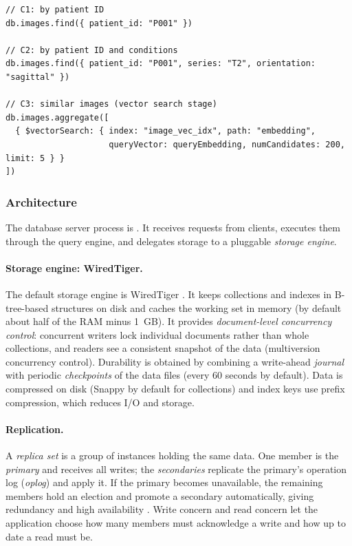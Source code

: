 \begin{lstlisting}[language=mongosh,caption={Query forms of the three case studies (sketch)}]
// C1: by patient ID
db.images.find({ patient_id: "P001" })

// C2: by patient ID and conditions
db.images.find({ patient_id: "P001", series: "T2", orientation: "sagittal" })

// C3: similar images (vector search stage)
db.images.aggregate([
  { $vectorSearch: { index: "image_vec_idx", path: "embedding",
                     queryVector: queryEmbedding, numCandidates: 200, limit: 5 } }
])
\end{lstlisting}

\subsubsection{Architecture}
\label{sec:mongodb-arch}
The database server process is . It receives requests from clients, executes them
through the query engine, and delegates storage to a pluggable \emph{storage engine}.

\paragraph{Storage engine: WiredTiger.}
The default storage engine is WiredTiger \cite{mongodb-storage}. It keeps collections and indexes
in B-tree-based structures on disk and caches the working set in memory (by default about half of
the RAM minus 1~GB). It provides \emph{document-level concurrency control}: concurrent writers lock
individual documents rather than whole collections, and readers see a consistent snapshot of the
data (multiversion concurrency control). Durability is obtained by combining a write-ahead
\emph{journal} with periodic \emph{checkpoints} of the data files (every 60 seconds by default).
Data is compressed on disk (Snappy by default for collections) and index keys use prefix
compression, which reduces I/O and storage.

\paragraph{Replication.}
A \emph{replica set} is a group of  instances holding the same data. One member is the
\emph{primary} and receives all writes; the \emph{secondaries} replicate the primary's operation log
(\emph{oplog}) and apply it. If the primary becomes unavailable, the remaining members hold an
election and promote a secondary automatically, giving redundancy and high availability
\cite{mongodb-replication}. Write concern and read concern let the application choose how many
members must acknowledge a write and how up to date a read must be.

